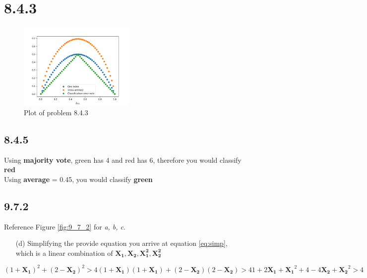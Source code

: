 \documentclass[12pt]{article}
\begin{document}
\section*{8.4.3}

\begin{figure}[ht!]
    \centering
    \includegraphics[width=0.5\textwidth]{../plots/8_4_3.png}
    \caption{Plot of problem 8.4.3}
    \label{fig:8_4_3}
\end{figure}

\subsection*{8.4.5}

Using \textbf{majority vote}, green has 4 and red has 6, therefore you would classify \textbf{red}\\

Using \textbf{average} = 0.45, you would classify \textbf{green}

\subsection*{9.7.2}

Reference Figure \ref{fig:9_7_2} for \textit{a, b, c}.

\begin{enumerate}
    \item[(d)] Simplifying the provide equation you arrive at equation \ref{eq:simp}, \\ which is a linear combination of $\mathbf{X_1},\mathbf{X_2},\mathbf{X_1^2},\mathbf{X_2^2}$
\end{enumerate}
\begin{subequations}
    \begin{equation}
        (1+\mathbf{X_1})^2+(2-\mathbf{X_2})^2 > 4
    \end{equation}
    \begin{equation}
        (1+\mathbf{X_1})(1+\mathbf{X_1})+(2-\mathbf{X_2})(2-\mathbf{X_2}) > 4
    \end{equation}
    \begin{equation}\label{eq:simp}
        1 + 2\mathbf{X_1} + \mathbf{X_1}^2 + 4 - 4\mathbf{X_2} + \mathbf{X_2}^2 > 4
    \end{equation}
\end{subequations}
\end{document}
